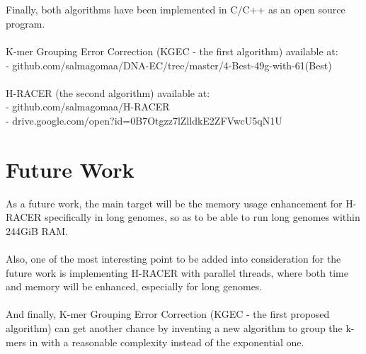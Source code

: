 \documentclass[12pt,openany]{llncs}
\begin{document}
\\
\\
Finally, both algorithms have been implemented in C/C++ as an open source program.
\\
\\
K-mer Grouping Error Correction (KGEC - the first algorithm) available at: 
\\
- github.com/salmagomaa/DNA-EC/tree/master/4-Best-49g-with-61(Best)
\\
\\
H-RACER (the second algorithm) available at: 
\\
- github.com/salmagomaa/H-RACER
\\
- drive.google.com/open?id=0B7Otgzz7lZlldkE2ZFVwcU5qN1U


\section{Future Work}
As a future work, the main target will be the memory usage enhancement for H-RACER specifically in long genomes, so as to be able to run long genomes within 244GiB RAM.
\\
\\
Also, one of the most interesting point to be added into consideration for the future work is implementing H-RACER with parallel threads, where both time and memory will be enhanced, especially for long genomes.
\\
\\
And finally, K-mer Grouping Error Correction (KGEC - the first proposed algorithm) can get another chance by inventing a new algorithm to group the k-mers in with a reasonable complexity instead of the exponential one.

\newpage

\clearpage\thispagestyle{empty}
 
\end{document}

